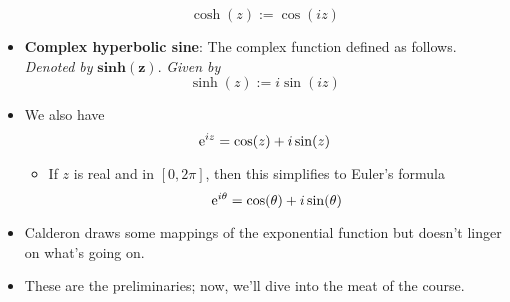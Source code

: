 \documentclass[../notes.tex]{subfiles}
\begin{document}
\begin{itemize}
    \begin{equation*}
        \cosh(z) := \cos(iz)
    \end{equation*}
    \item \textbf{Complex hyperbolic sine}: The complex function defined as follows. \emph{Denoted by} $\textbf{sinh}\bm{(z)}$. \emph{Given by}
    \begin{equation*}
        \sinh(z) := i\sin(iz)
    \end{equation*}
    \item We also have
    \begin{equation*}
        \e[iz] = \cos(z)+i\sin(z)
    \end{equation*}
    \begin{itemize}
        \item If $z$ is real and in $[0,2\pi]$, then this simplifies to Euler's formula
        \begin{equation*}
            \e[i\theta] = \cos(\theta)+i\sin(\theta)
        \end{equation*}
    \end{itemize}
    \item Calderon draws some mappings of the exponential function but doesn't linger on what's going on.
    \item These are the preliminaries; now, we'll dive into the meat of the course.
\end{itemize}
\end{document}
